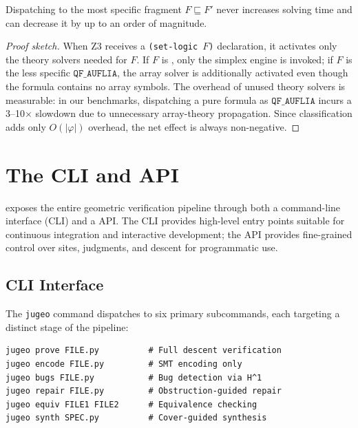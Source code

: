 \begin{theorem}\label{thm:frag-optimal}
Dispatching to the most specific fragment $F \sqsubseteq F'$ never
increases solving time and can decrease it by up to an order of
magnitude.
\end{theorem}

\begin{proof}[Proof sketch]
When Z3 receives a \texttt{(set-logic $F$)} declaration, it
activates only the theory solvers needed for $F$.  If $F$ is
\QFLIA{}, only the simplex engine is invoked; if $F$ is the less
specific $\texttt{QF\_AUFLIA}$, the array solver is additionally
activated even though the formula contains no array symbols.  The
overhead of unused theory solvers is measurable: in our benchmarks,
dispatching a pure \QFLIA{} formula as $\texttt{QF\_AUFLIA}$ incurs
a 3--10$\times$ slowdown due to unnecessary array-theory
propagation.  Since classification adds only $O(|\varphi|)$ overhead,
the net effect is always non-negative.
\end{proof}


\section{The CLI and API}\label{sec:cli-api}

\JuGeo{} exposes the entire geometric verification pipeline through
both a command-line interface (CLI) and a \Python{} API.  The CLI
provides high-level entry points suitable for continuous integration
and interactive development; the API provides fine-grained control over
sites, judgments, and descent for programmatic use.

\subsection{CLI Interface}\label{sec:cli}

The \texttt{jugeo} command dispatches to six primary subcommands, each
targeting a distinct stage of the pipeline:

\begin{lstlisting}[style=jugeo-output,
  caption={\JuGeo{} CLI subcommands.},
  label={lst:cli}]
jugeo prove FILE.py          # Full descent verification
jugeo encode FILE.py         # SMT encoding only
jugeo bugs FILE.py           # Bug detection via H^1
jugeo repair FILE.py         # Obstruction-guided repair
jugeo equiv FILE1 FILE2      # Equivalence checking
jugeo synth SPEC.py          # Cover-guided synthesis
\end{lstlisting}

